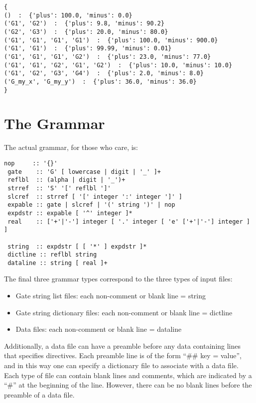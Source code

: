 \documentclass{article}[11pt]
\begin{document}
\begin{lstlisting}[frame=single,caption=Resulting internal dictionary resulting from the example data file above]
{
()  :  {'plus': 100.0, 'minus': 0.0}
('G1', 'G2')  :  {'plus': 9.8, 'minus': 90.2}
('G2', 'G3')  :  {'plus': 20.0, 'minus': 80.0}
('G1', 'G1', 'G1', 'G1')  :  {'plus': 100.0, 'minus': 900.0}
('G1', 'G1')  :  {'plus': 99.99, 'minus': 0.01}
('G1', 'G1', 'G1', 'G2')  :  {'plus': 23.0, 'minus': 77.0}
('G1', 'G1', 'G2', 'G1', 'G2')  :  {'plus': 10.0, 'minus': 10.0}
('G1', 'G2', 'G3', 'G4')  :  {'plus': 2.0, 'minus': 8.0}
('G_my_x', 'G_my_y')  :  {'plus': 36.0, 'minus': 36.0}
}
\end{lstlisting}


\section{The Grammar}

The actual grammar, for those who care, is:
\begin{lstlisting}[frame=single,caption=The formal grammar used to parse GST input files]
 nop     :: '{}'
 gate    :: 'G' [ lowercase | digit | '_' ]+
 reflbl  :: (alpha | digit | '_')+
 strref  :: 'S' '[' reflbl ']'
 slcref  :: strref [ '[' integer ':' integer ']' ]
 expable :: gate | slcref | '(' string ')' | nop
 expdstr :: expable [ '^' integer ]*
 real    :: ['+'|'-'] integer [ '.' integer [ 'e' ['+'|'-'] integer ] ]

 string  :: expdstr [ [ '*' ] expdstr ]*
 dictline :: reflbl string
 dataline :: string [ real ]+
\end{lstlisting}

The final three grammar types correspond to the three types of input files:
\begin{itemize}
\item Gate string list files: each non-comment or blank line = string
\item Gate string dictionary files:  each non-comment or blank line = dictline
\item Data files:  each non-comment or blank line = dataline
\end{itemize}

Additionally, a data file can have a preamble before any data containing lines that specifies directives.  Each preamble line is of the form ``\#\# key = value'', and in this way one can specify a dictionary file to associate with a data file.  Each type of file can contain blank lines and comments, which are indicated by a ``\#'' at the beginning of the line.  However, there can be no blank lines before the preamble of a data file.
\end{document}
